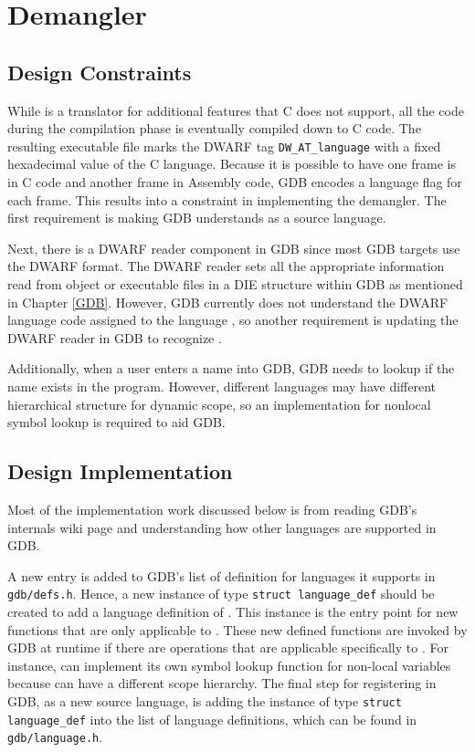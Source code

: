 \chapter{\CFAS Demangler} \label{demangler}

\section{Design Constraints}
While \CFAS is a translator for additional features that C does not support, all
the code during the compilation phase is eventually compiled down to C code.
The resulting executable file marks the DWARF tag \verb|DW_AT_language| with a
fixed hexadecimal value of the C language. Because it is possible to have one frame is in C code and another
frame in Assembly code, GDB encodes a language flag for each frame. This
results into a constraint in implementing the demangler. The first requirement is
making GDB understands \CFAS as a source language.

Next, there is a DWARF reader component in GDB since most GDB targets use the DWARF
format. The DWARF reader sets all the appropriate information read from object or
executable files in a DIE structure within GDB as mentioned in Chapter
\ref{GDB}. However, GDB currently does not understand the DWARF language code
assigned to the
language \CFA, so another requirement is updating the DWARF reader in GDB to
recognize \CFA.

Additionally, when a user enters a name into GDB, GDB needs to lookup if the
name exists in the program. However, different languages may have different
hierarchical structure for dynamic scope, so an implementation for nonlocal
symbol lookup is required to aid GDB.

\section{Design Implementation}
Most of the implementation work discussed below is from reading GDB's internals
wiki page and understanding how other languages are supported in GDB\cite{reference5}.

A new entry is added to GDB's list of definition for languages it supports in
\verb|gdb/defs.h|. Hence, a new instance of type \verb|struct language_def|
should be created to add a language definition of \CFAS. This instance is the
entry point for new functions that are only applicable to \CFA. These new
defined functions are invoked by GDB at runtime if there are operations that
are applicable specifically to \CFA. For instance, \CFAS can implement its
own symbol lookup function for non-local variables because \CFAS can have a
different scope hierarchy. The final step for registering \CFAS in GDB, as a new
source language, is adding the instance of type \verb|struct language_def| into
the list of language definitions, which can be found in
\verb|gdb/language.h|.

